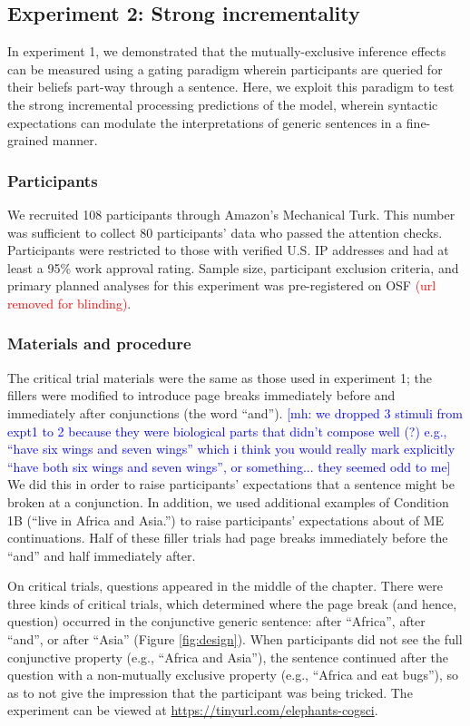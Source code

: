 \documentclass[10pt,letterpaper]{article}
\newcommand{\mh}[1]{{\textcolor{Blue}{[mh: #1]}}}
\newcommand{\red}[1]{{\textcolor{Red}{#1}}}
\begin{document}
\subsection{Experiment 2: Strong incrementality}

In experiment 1, we demonstrated that the mutually-exclusive inference effects can be measured using a gating paradigm wherein participants are queried for their beliefs part-way through a sentence. 
Here, we exploit this paradigm to test the strong incremental processing predictions of the model, wherein syntactic expectations can modulate the interpretations of generic sentences in a fine-grained manner. 

\subsubsection{Participants}

We recruited 108 participants through Amazon's Mechanical Turk.
This number was sufficient to collect 80 participants' data who passed the attention checks.  
Participants were restricted to those with verified U.S. IP addresses and had at least a 95\% work approval rating. 
Sample size, participant exclusion criteria, and primary planned analyses for this experiment was pre-registered on OSF \red{(url removed for blinding)}.

\subsubsection{Materials and procedure}

The critical trial materials were the same as those used in experiment 1; the fillers were modified to introduce page breaks immediately before and immediately after conjunctions (the word ``and''). 
\mh{we dropped 3 stimuli from expt1 to 2 because they were biological parts that didn't compose well (?) e.g., ``have six wings and seven wings'' which i think you would really mark explicitly ``have both six wings and seven wings'', or something... they seemed odd to me}
We did this in order to raise participants' expectations that a sentence might be broken at a conjunction. 
In addition, we used additional examples of Condition 1B (``live in Africa and Asia.'') to raise participants' expectations about of ME continuations.
Half of these filler trials had page breaks immediately before the ``and'' and half immediately after.

On critical trials, questions appeared in the middle of the chapter. 
There were three kinds of critical trials, which determined where the page break (and hence, question) occurred in the conjunctive generic sentence: after ``Africa'', after ``and'', or after ``Asia'' (Figure \ref{fig:design}). 
When participants did not see the full conjunctive property (e.g., ``Africa and Asia''), the sentence continued after the question with a non-mutually exclusive property (e.g., ``Africa and eat bugs''), so as to not give the impression that the participant was being tricked. 
The experiment can be viewed at \url{https://tinyurl.com/elephants-cogsci}.
\end{document}

